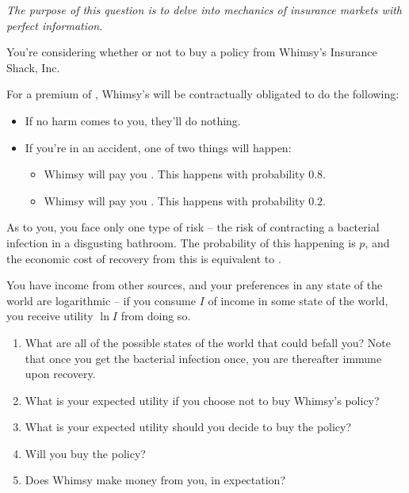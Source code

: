 \documentclass{article}
\begin{document}
\small{\textit{The purpose of this question is to delve into mechanics of insurance markets with perfect information.}}

You're considering whether or not to buy a policy from Whimsy's Insurance Shack, Inc.

For a premium of , Whimsy's will be contractually obligated to do the following:

\begin{itemize}
\item If no harm comes to you, they'll do nothing.
\item If you're in an accident, one of two things will happen:
\begin{itemize}
\item Whimsy will pay you . This happens with probability $0.8$.
\item Whimsy will pay you . This happens with probability $0.2$.
\end{itemize}
\end{itemize}

As to you, you face only one type of risk -- the risk of contracting a bacterial infection in a disgusting bathroom. The probability of this happening is $p$, and the economic cost of recovery from this is equivalent to .

You have income  from other sources, and your preferences in any state of the world are logarithmic -- if you consume $I$ of income in some state of the world, you receive utility $\ln I$ from doing so.

\begin{enumerate}
\item What are all of the possible states of the world that could befall you? Note that once you get the bacterial infection once, you are thereafter immune upon recovery.

\item What is your expected utility if you choose not to buy Whimsy's policy?

\item What is your expected utility should you decide to buy the policy?

\item Will you buy the policy?

\item Does Whimsy make money from you, in expectation?
\end{enumerate}
\end{document}
